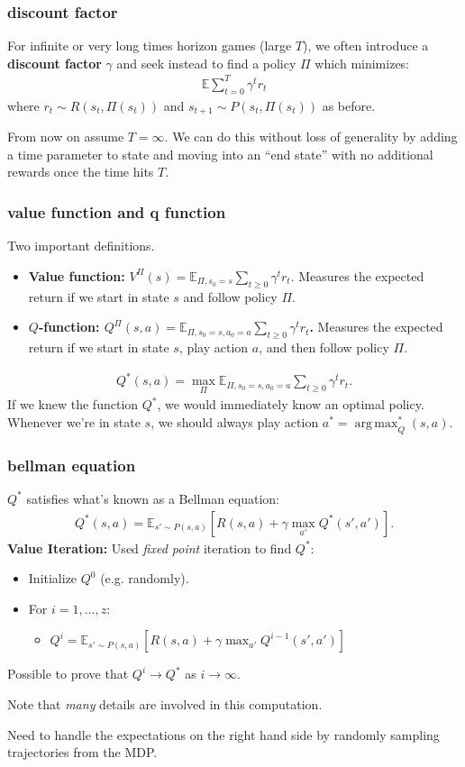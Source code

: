 \documentclass[handout,compress]{beamer}
\newcommand{\E}{\mathbb{E}}
\DeclareMathOperator*{\argmax}{arg\,max}
\begin{document}
\begin{frame}
	\frametitle{discount factor}
	For infinite or very long times horizon games (large $T$), we often introduce a \textbf{discount factor} $\gamma$ and seek instead to find a policy $\Pi$ which minimizes:
	\begin{align*}
	\E \sum_{t = 0}^T \gamma^t r_t
	\end{align*}
	where $r_t \sim R(s_t,\Pi(s_t))$ and $s_{t+1} \sim P(s_t,\Pi(s_t))$ as before. 
	
	From now on assume $T = \infty$. We can do this without loss of generality by adding a time parameter to state and moving into an ``end state'' with no additional rewards once the time hits $T$. 
\end{frame}

\begin{frame}
	\frametitle{value function and q function}
	Two important definitions. 
	\begin{itemize}
		\item \textbf{Value function:} $V^\Pi(s) = \E_{\Pi,s_0 = s} \sum_{t\geq 0}\gamma^t r_t$. Measures the expected return if we start in state $s$ and follow policy $\Pi$. 
		\item \textbf{$Q$-function: $Q^\Pi(s,a) = \E_{\Pi,s_0 = s, a_0 = a} \sum_{t\geq 0}\gamma^t r_t$.} Measures the expected return if we start in state $s$, play action $a$, and then follow policy $\Pi$. 
	\end{itemize}
\begin{align*}
	Q^*(s,a)= \max_\Pi \E_{\Pi,s_0 = s, a_0 = a} \sum_{t\geq 0}\gamma^t r_t.
\end{align*}
\alert{If we knew the function $Q^*$, we would immediately know an optimal policy. Whenever we're in state $s$, we should always play action $a^* = \argmax_ Q^*(s,a)$.}
\end{frame}

\begin{frame}
	\frametitle{bellman equation}
	$Q^*$ satisfies what's known as a Bellman equation:
	\begin{align*}
	Q^*(s,a) = \E_{s' \sim P(s,a)} \left[R(s,a) + \gamma \max_{a'}Q^*(s',a')\right].
	\end{align*}
	\textbf{Value Iteration:} Used \emph{fixed point} iteration to find $Q^*$:
	\begin{itemize}
		\item Initialize $Q^0$ (e.g. randomly).
		\item For $i=1,\ldots, z$:
		\begin{itemize}
			\item $Q^{i} = \E_{s' \sim P(s,a)} \left[R(s,a) + \gamma \max_{a'}Q^{i-1}(s',a')\right]$
		\end{itemize}
	\end{itemize}
Possible to prove that $Q^i \rightarrow Q^*$ as $i \rightarrow \infty$.
\begin{center}
	\alert{Note that \emph{many} details are involved in this computation.}
	
	Need to handle the expectations on the right hand side by randomly sampling trajectories from the MDP.
\end{center}
\end{frame}
\end{document}
